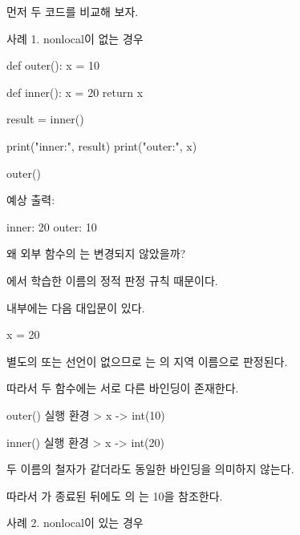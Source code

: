 먼저 두 코드를 비교해 보자.

\begin{dhknote}
\begin{dhksmry}[centered]
사례 1. nonlocal이 없는 경우
\end{dhksmry}
\end{dhknote}

\begin{dhkcode}
def outer():
    x = 10

    def inner():
        x = 20
        return x

    result = inner()

    print("inner:", result)
    print("outer:", x)


outer()
\end{dhkcode}

예상 출력:

\begin{dhkzsh}
inner: 20
outer: 10
\end{dhkzsh}

왜 외부 함수의 는 변경되지 않았을까?

에서 학습한 이름의 정적 판정 규칙 때문이다.

 내부에는 다음 대입문이 있다.

\begin{dhkcode}
x = 20
\end{dhkcode}

별도의  또는  선언이 없으므로 는 의 지역 이름으로 판정된다.

따라서 두 함수에는 서로 다른 바인딩이 존재한다.

\begin{dhkdir}[in=6]
outer() 실행 환경
> x -> int(10)
\end{dhkdir}

\begin{dhkdir}[in=6]
inner() 실행 환경
> x -> int(20)
\end{dhkdir}

두 이름의 철자가 같더라도 동일한 바인딩을 의미하지 않는다.

따라서 가 종료된 뒤에도 의 는 10을 참조한다.

\begin{dhknote}
\begin{dhksmry}[centered]
사례 2. nonlocal이 있는 경우
\end{dhksmry}
\end{dhknote}

